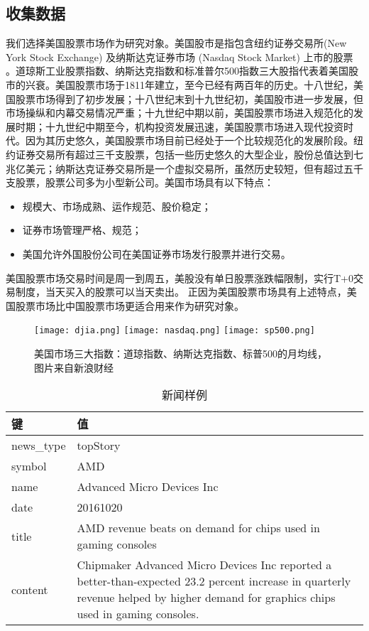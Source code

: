 \subsection{收集数据}
我们选择美国股票市场作为研究对象。美国股市是指包含纽约证券交易所(New York Stock Exchange) 及纳斯达克证券市场 (Nasdaq Stock Market) 上市的股票 。道琼斯工业股票指数、纳斯达克指数和标准普尔500指数三大股指代表着美国股市的兴衰。美国股票市场于1811年建立，至今已经有两百年的历史。十八世纪，美国股票市场得到了初步发展；十八世纪末到十九世纪初，美国股市进一步发展，但市场操纵和内幕交易情况严重；十九世纪中期以前，美国股票市场进入规范化的发展时期；十九世纪中期至今，机构投资发展迅速，美国股票市场进入现代投资时代。因为其历史悠久，美国股票市场目前已经处于一个比较规范化的发展阶段。纽约证券交易所有超过三千支股票，包括一些历史悠久的大型企业，股份总值达到七兆亿美元；纳斯达克证券交易所是一个虚拟交易所，虽然历史较短，但有超过五千支股票，股票公司多为小型新公司。美国市场具有以下特点：
\begin{itemize}
	\item 规模大、市场成熟、运作规范、股价稳定；
	\item 证券市场管理严格、规范；
	\item 美国允许外国股份公司在美国证券市场发行股票并进行交易。
\end{itemize}

美国股票市场交易时间是周一到周五，美股没有单日股票涨跌幅限制，实行T+0交易制度，当天买入的股票可以当天卖出。
正因为美国股票市场具有上述特点，美国股票市场比中国股票市场更适合用来作为研究对象。

\begin{figure}[H]
	\centering 
	\texttt{[image: djia.png]}
	\texttt{[image: nasdaq.png]}
	\texttt{[image: sp500.png]}
	\caption{美国市场三大指数：道琼指数、纳斯达克指数、标普500的月均线，图片来自新浪财经}
	\label{fig:index}
\end{figure}

\begin{table}[ht]
    \centering
    \begin{minipage}[t]{0.8\linewidth}
    	\caption[]{新闻样例}
    	\label{tab:newsexample}
    	\begin{tabularx}{1\linewidth}{lX}
    		\toprule[1.5pt]
    		键 & 值 \\ \midrule[1pt]
    		news\_type & topStory \\ 
    		symbol & AMD \\ 
    		name & Advanced Micro Devices Inc \\ 
    		date & 20161020 \\ 
    		title & AMD revenue beats on demand for chips used in gaming consoles \\ 
    		content & Chipmaker Advanced Micro Devices Inc reported a better-than-expected 23.2 percent increase in quarterly revenue helped by higher demand for graphics chips used in gaming consoles. \\ 
    		\bottomrule[1.5pt]
    	\end{tabularx}
    \end{minipage}
\end{table}

